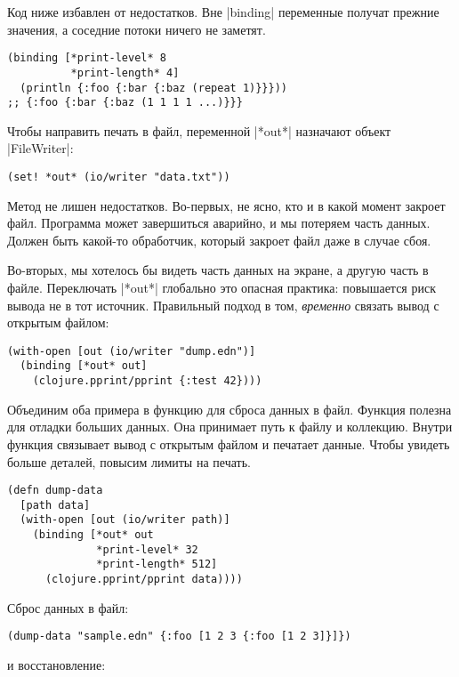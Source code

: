 Код ниже избавлен от недостатков. Вне \spverb|binding| переменные получат
прежние значения, а соседние потоки ничего не заметят.

\begin{verbatim}
(binding [*print-level* 8
          *print-length* 4]
  (println {:foo {:bar {:baz (repeat 1)}}}))
;; {:foo {:bar {:baz (1 1 1 1 ...)}}}
\end{verbatim}

Чтобы направить печать в файл, переменной \spverb|*out*| назначают объект
\spverb|FileWriter|:

\begin{verbatim}
(set! *out* (io/writer "data.txt"))
\end{verbatim}

Метод не лишен недостатков. Во-первых, не ясно, кто и в какой момент закроет
файл. Программа может завершиться аварийно, и мы потеряем часть данных. Должен
быть какой-то обработчик, который закроет файл даже в случае сбоя.

Во-вторых, мы хотелось бы видеть часть данных на экране, а другую часть в
файле. Переключать \spverb|*out*| глобально это опасная практика: повышается
риск вывода не в тот источник. Правильный подход в том, \emph{временно} связать
вывод с открытым файлом:

\begin{verbatim}
(with-open [out (io/writer "dump.edn")]
  (binding [*out* out]
    (clojure.pprint/pprint {:test 42})))
\end{verbatim}

Объединим оба примера в функцию для сброса данных в файл. Функция полезна для
отладки больших данных. Она принимает путь к файлу и коллекцию. Внутри функция
связывает вывод с открытым файлом и печатает данные. Чтобы увидеть больше
деталей, повысим лимиты на печать.

\begin{verbatim}
(defn dump-data
  [path data]
  (with-open [out (io/writer path)]
    (binding [*out* out
              *print-level* 32
              *print-length* 512]
      (clojure.pprint/pprint data))))
\end{verbatim}

\noindent
Сброс данных в файл:

\begin{verbatim}
(dump-data "sample.edn" {:foo [1 2 3 {:foo [1 2 3]}]})
\end{verbatim}

\noindent
и восстановление:


